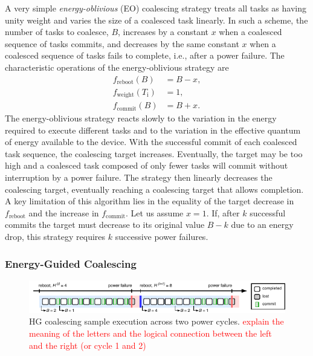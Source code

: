 A very simple {\em energy-oblivious} (EO) coalescing strategy treats all tasks as having unity weight and varies the size of a coalesced task linearly. In such a scheme, the number of tasks to coalesce, $B$, increases by a constant $x$ when a coalesced sequence of tasks commits, and decreases by the same constant $x$ when a coalesced sequence of tasks fails to complete, i.e., after a power failure. The characteristic operations of the energy-oblivious strategy are
%
\begin{equation}
	\begin{split}
		f_\text{reboot}(B) & = B - x, \\
		f_\text{weight}(T_\text{i}) & =  1, \\
		f_\text{commit}(B) & = B + x.
	\end{split}
	\label{eq:eo}
\end{equation}
%
The energy-oblivious strategy reacts slowly to the variation in the energy required to execute different tasks and to the variation in the effective quantum of energy available to the device. With the successful commit of each coalesced task sequence, the coalescing target increases. Eventually, the target may be too high and a coalesced task composed of only fewer tasks will commit without interruption by a power failure. The strategy then linearly decreases the coalescing target, eventually reaching a coalescing target that allows completion. A key limitation of this algorithm lies in the equality of the target decrease in $f_\text{reboot}$ and the increase in $f_\text{commit}$. Let us assume $x=1$. If, after $k$ successful commits the target must decrease to its original value $B-k$ due to an energy drop, this strategy requires $k$ successive power failures.

\subsubsection{Energy-Guided Coalescing}
\label{subsec:energyAware}

\begin{figure}
    \includegraphics[width=\linewidth]{figures/hg-coal-horiz.pdf}
    \caption{HG coalescing sample execution across two power cycles. \textcolor{red}{explain the meaning of the letters and the logical connection between the left and the right (or cycle 1 and 2)}}
    \label{fig:hg-coal}
\end{figure}

